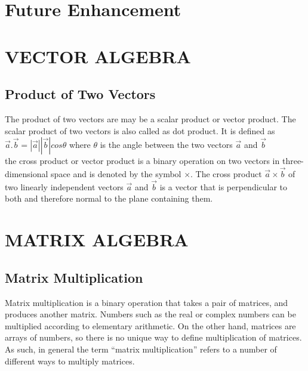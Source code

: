 \documentclass[BTech]{srmuthesis}
\begin{document}
\chapter{Future Enhancement}


\appendix
\chapter{VECTOR ALGEBRA}
\section{Product of Two Vectors}
\label{app:vp}
The product of two vectors are may be a scalar product or vector product. The scalar product of two vectors is also called as dot product. It is defined as $\vec{a} . \vec{b}=|\vec{a}||\vec{b}|cos\theta$ where $\theta$ is the angle between the two vectors $\vec{a}$ and $\vec{b}$\\

the cross product or vector product is a binary operation on two vectors in three-dimensional space and is denoted by the symbol $\times$. The cross product $\vec{a}\times\vec{b}$ of two linearly independent vectors $\vec{a}$ and $\vec{b}$ is a vector that is perpendicular to both and therefore normal to the plane containing them. 
\chapter{MATRIX ALGEBRA}
\section{Matrix Multiplication}
Matrix multiplication is a binary operation that takes a pair of matrices, and produces another matrix. Numbers such as the real or complex numbers can be multiplied according to elementary arithmetic. On the other hand, matrices are arrays of numbers, so there is no unique way to define multiplication of matrices. As such, in general the term ``matrix multiplication'' refers to a number of different ways to multiply matrices. 

\begin{singlespace}
\end{singlespace}
\end{document}
